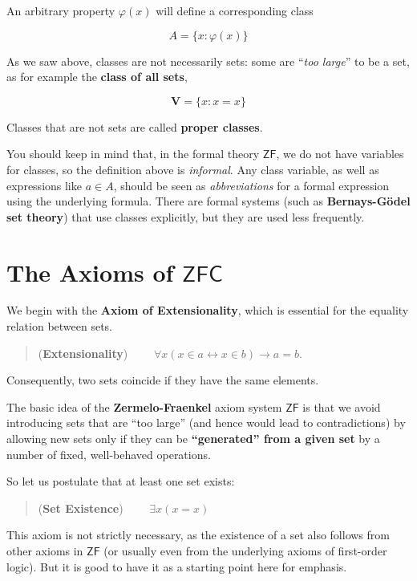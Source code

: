 \documentclass{article}
\newcommand{\ZF}{\mathsf{ZF}}
\begin{document}
An arbitrary property $\varphi(x)$ will define a corresponding class

\begin{equation}
A = \{x \colon \varphi(x)\}
\end{equation}

As we saw above, classes are not necessarily sets: some are ``\textit{too large}'' to be a set, as for example the \textbf{class of all sets},

\begin{equation}
\mathbf{V} = \{ x \colon x = x \}
\end{equation}

Classes that are not sets are called \textbf{proper classes}.

You should keep in mind that, in the formal theory $\ZF$, we do not have variables for classes, so the definition above is \textit{informal}.  Any class variable, as well as expressions like $a \in A$, should be seen as \textit{abbreviations} for a formal expression using the underlying formula.
There are formal systems (such as \textbf{Bernays-Gödel set theory}) that use classes explicitly, but they are used less frequently.

\section{The Axioms of $\mathsf{ZFC}$}

We begin with the \textbf{Axiom of Extensionality}, which is essential for the equality relation between sets.

\begin{quote}
(\textbf{Extensionality})  $\qquad \forall x (x \in a  \leftrightarrow x \in b)  \to a=b.$
\end{quote}

Consequently, two sets coincide if they have the same elements.

The basic idea of the \textbf{Zermelo-Fraenkel} axiom system $\ZF$ is that we avoid introducing sets that are ``too large'' (and hence would lead to contradictions) by allowing new sets only if they can be \textbf{``generated'' from a given set} by a number of fixed, well-behaved operations.

So let us postulate that at least one set exists:

\begin{quote}
(\textbf{Set Existence}) $\qquad \exists x ( x = x )$
\end{quote}

This axiom is not strictly necessary, as the existence of a set also follows from other axioms in $\ZF$ (or usually even from the underlying axioms of first-order logic). But it is good to have it as a starting point here for emphasis.
\end{document}
